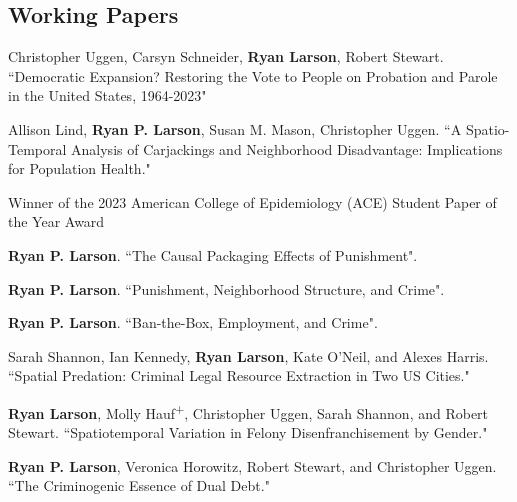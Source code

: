 \documentclass[letterpaper]{article}
\renewenvironment{itemize}{
  \begin{list}{}{
    \setlength{\leftmargin}{1.5em}
  }
}{
  \end{list}
}
\begin{document}
\subsection*{Working Papers}
\begin{itemize}

\item Christopher Uggen, Carsyn Schneider, \textbf{Ryan Larson}, Robert Stewart. ``Democratic Expansion? Restoring the Vote to People on Probation and Parole in the United States, 1964-2023"
\item Allison Lind, \textbf{Ryan P. Larson}, Susan M. Mason, Christopher Uggen. ``A Spatio-Temporal Analysis of Carjackings and Neighborhood Disadvantage: Implications for Population Health."
\begin{itemize}
\item Winner of the 2023 American College of Epidemiology (ACE) Student Paper of the Year Award
\end{itemize}
\item \textbf{Ryan P. Larson}. ``The Causal Packaging Effects of Punishment".
\item \textbf{Ryan P. Larson}. ``Punishment, Neighborhood Structure, and Crime".
\item \textbf{Ryan P. Larson}. ``Ban-the-Box, Employment, and Crime".
\item Sarah Shannon, Ian Kennedy, \textbf{Ryan Larson}, Kate O'Neil, and Alexes Harris. ``Spatial Predation: Criminal Legal Resource Extraction in Two US Cities."
\item \textbf{Ryan Larson}, Molly Hauf\textsuperscript{+}, Christopher Uggen, Sarah Shannon, and Robert Stewart. ``Spatiotemporal Variation in Felony Disenfranchisement by Gender."
\item \textbf{Ryan P. Larson}, Veronica Horowitz, Robert Stewart, and Christopher Uggen. ``The Criminogenic Essence of Dual Debt."


\end{itemize}
\end{document}
